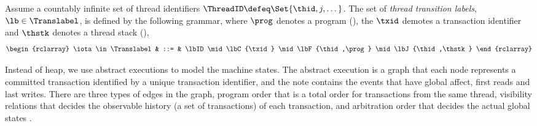 \begin{defn}
\label{def:label}
Assume a countably infinite set of thread identifiers $\ThreadID \defeq \Set{\thid, j, \dots} $.
The set of \emph{thread transition labels}, $\lb \in \Translabel$, is defined by the following grammar, where $\prog$ denotes a program (), the $\txid$ demotes a transaction identifier and $\thstk$ denotes a thread stack (),
\[
    \begin{rclarray}
	\iota \in \Translabel & ::= & \lbID \mid \lbC{\txid} \mid \lbF{\thid,\prog} \mid \lbJ{\thid,\thstk}
    \end{rclarray}
\]
\end{defn}

Instead of heap, we use abstract executions to model the machine states.
The abstract execution is a graph that each node represents a committed transaction identified by a unique transaction identifier, and the note contains the events that have global affect, \ie first reads and last writes.
There are three types of edges in the graph, program order that is a total order for transactions from the same thread, visibility relations that decides the observable history (a set of transactions) of each transaction, and arbitration order that decides the actual global states \cite{eventually-consistent-transactions}.

